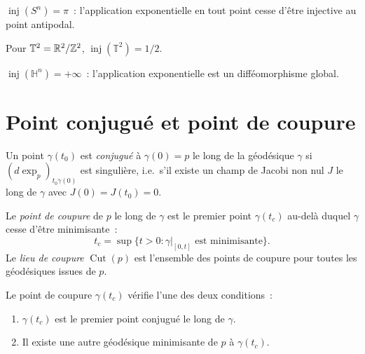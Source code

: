 \begin{exemple}
$\operatorname{inj}(S^n) = \pi$~: l'application exponentielle en tout point cesse
d'\^etre injective au point antipodal.
\end{exemple}

\begin{exemple}
Pour $\mathbb{T}^2 = \mathbb{R}^2/\mathbb{Z}^2$, $\operatorname{inj}(\mathbb{T}^2) = 1/2$.
\end{exemple}

\begin{exemple}
$\operatorname{inj}(\mathbb{H}^n) = +\infty$~: l'application exponentielle est un
diff\'eomorphisme global.
\end{exemple}

\section{Point conjugu\'e et point de coupure}

\begin{definition}
Un point $\gamma(t_0)$ est \emph{conjugu\'e} \`a $\gamma(0) = p$ le long de la
g\'eod\'esique $\gamma$ si $(d\exp_p)_{t_0 \dot\gamma(0)}$ est singuli\`ere, i.e.\
s'il existe un champ de Jacobi non nul $J$ le long de $\gamma$ avec
$J(0) = J(t_0) = 0$.
\end{definition}

\begin{definition}
Le \emph{point de coupure} de $p$ le long de $\gamma$ est le premier point
$\gamma(t_c)$ au-del\`a duquel $\gamma$ cesse d'\^etre minimisante~:
\[
    t_c = \sup\{t > 0 : \gamma|_{[0,t]} \text{ est minimisante}\}.
\]
Le \emph{lieu de coupure} $\operatorname{Cut}(p)$ est l'ensemble des points de
coupure pour toutes les g\'eod\'esiques issues de $p$.
\end{definition}

\begin{theoreme}
Le point de coupure $\gamma(t_c)$ v\'erifie l'une des deux conditions~:
\begin{enumerate}
    \item $\gamma(t_c)$ est le premier point conjugu\'e le long de $\gamma$.
    \item Il existe une autre g\'eod\'esique minimisante de $p$ \`a $\gamma(t_c)$.
\end{enumerate}
\end{theoreme}

